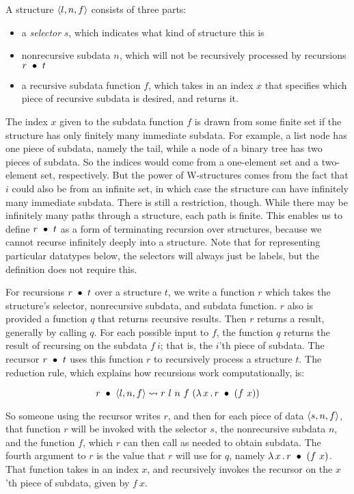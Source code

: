 \documentclass{article}
\begin{document}
A structure $\langle l , n, f \rangle$ consists of three parts:
\begin{itemize}
\item a \emph{selector} $s$, which indicates what kind of structure this is
\item nonrecursive subdata $n$, which will not be recursively processed
  by recursions $r\ \bullet\ t$
\item a recursive subdata function $f$, which takes in an index $x$
  that specifies which piece of recursive subdata is desired, and
  returns it.
  \end{itemize}

\noindent The index $x$ given to the subdata function $f$ is drawn
from some finite set if the structure has only finitely many immediate
subdata.  For example, a list node has one piece of subdata, namely
the tail, while a node of a binary tree has two pieces of subdata.  So
the indices would come from a one-element set and a two-element set,
respectively.  But the power of W-structures comes from the fact that
$i$ could also be from an infinite set, in which case the structure
can have infinitely many immediate subdata.  There is still a
restriction, though.  While there may be infinitely many paths through
a structure, each path is finite.  This enables us to define
$r\ \bullet\ t$ as a form of terminating recursion over structures,
because we cannot recurse infinitely deeply into a structure.  Note
that for representing particular datatypes below, the selectors will
always just be labels, but the definition does not require this.

For recursions $r\ \bullet\ t$ over a structure $t$, we write a function
$r$ which takes the structure's selector, nonrecursive subdata, and
subdata function.  $r$ also is provided a function $q$ that returns
recursive results.  Then $r$  returns a result, generally by calling
$q$.  For each possible input to $f$, the function $q$ returns the
result of recursing on the subdata $f\ i$; that is, the $i$'th piece
of subdata.  The recursor $r\ \bullet\ t$ uses this function $r$ to
recursively process a structure $t$. The reduction rule, which
explains how recursions work computationally, is:

\[
\wrec{r}{\ctor{l}{n}{f}} \leadsto r\ l\ n\ f\ (\lam{x}{\wrec{r}{(f\ x)}})
\]

\noindent So someone using the recursor writes $r$, and then for each
piece of data $\langle s , n, f \rangle$, that function $r$ will be invoked with
the selector $s$, the nonrecursive subdata $n$, and the function $f$,
which $r$ can then call as needed to obtain subdata.  The fourth
argument to $r$ is the value that $r$ will use for $q$, namely
$\lambda\, x\, .\, r\ \bullet\ (f\ x)$.  That function takes in an index $x$, and
recursively invokes the recursor on the $x$'th piece of subdata, given
by $f\ x$.  
\end{document}
